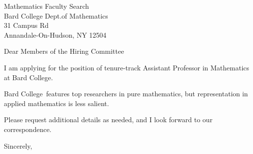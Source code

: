 




	
	
	\def\School{Bard College}
	
	\begin{letter}
		{Mathematics Faculty Search\\
			Bard College Dept.of Mathematics\\
			31 Campus Rd\\
			Annandale-On-Hudson, NY 12504
		}
		
		\opening{Dear Members of the Hiring Committee}
		
		
		I am applying for the position of tenure-track Assistant Professor in Mathematics at \School. 
		
		
		
		\School~features top researchers in pure mathematics, but representation in applied mathematics is less salient. 
		
		
		
		
		
		Please request additional details as needed, and I look forward to our correspondence.
		
		\closing{Sincerely,}
	\end{letter}
